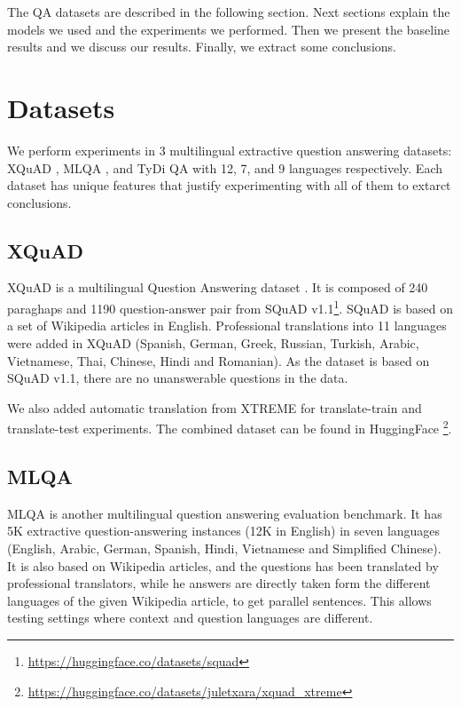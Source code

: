 \documentclass[11pt]{article}
\begin{document}
The QA datasets are described in the following section. Next sections explain the models we used and the experiments we performed. Then we present the baseline results and we discuss our results. Finally, we extract some conclusions.

\section{Datasets}

We perform experiments in 3 multilingual extractive question answering datasets: XQuAD \cite{Artetxe:etal:2019}, MLQA \cite{lewis2019mlqa}, and TyDi QA \cite{tydiqa} with 12, 7, and 9 languages respectively. Each dataset has unique features that justify experimenting with all of them to extarct conclusions.

\subsection{XQuAD}

XQuAD is a multilingual Question Answering dataset \cite{Artetxe:etal:2019}. It is composed of 240 paraghaps and 1190 question-answer pair from SQuAD v1.1\footnote{\url{https://huggingface.co/datasets/squad}}. SQuAD is based on a set of Wikipedia articles in English. Professional translations into 11 languages were added in XQuAD (Spanish, German, Greek, Russian, Turkish, Arabic, Vietnamese, Thai, Chinese, Hindi and Romanian). As the dataset is based on SQuAD v1.1, there are no unanswerable questions in the data. 

We also added automatic translation from XTREME \cite{XTREME} for translate-train and translate-test experiments. The combined dataset can be found in HuggingFace \footnote{\url{https://huggingface.co/datasets/juletxara/xquad_xtreme}}.

\subsection{MLQA}

MLQA \cite{lewis2019mlqa} is another multilingual question answering evaluation benchmark. It has 5K extractive question-answering instances (12K in English) in seven languages (English, Arabic, German, Spanish, Hindi, Vietnamese and Simplified Chinese). It is also based on Wikipedia articles, and the questions has been translated by professional translators, while he answers are directly taken form the different languages of the given Wikipedia article, to get parallel sentences. This allows testing settings where context and question languages are different.
\end{document}
